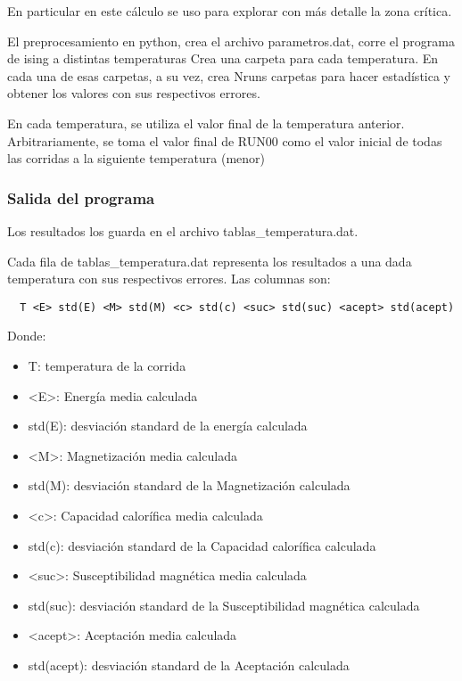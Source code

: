 En particular en este c\'alculo se uso para explorar con m\'as detalle la zona
cr\'itica.

El preprocesamiento en python, crea el archivo parametros.dat, 
 corre el programa de ising a distintas temperaturas
  Crea una carpeta para cada temperatura. En cada una de esas carpetas, a su
  vez, crea Nruns carpetas para hacer estadística y obtener los valores con
  sus respectivos errores.
 
  En cada temperatura, se utiliza el valor final de la temperatura anterior.
  Arbitrariamente, se toma el valor final de RUN00 como el valor inicial de
  todas las corridas a la siguiente temperatura (menor)
 

\subsubsection{Salida del programa}

Los resultados los guarda en el archivo tablas\_temperatura.dat.

Cada fila de tablas\_temperatura.dat representa los resultados a una dada
temperatura con sus respectivos errores. Las columnas son:

\begin{verbatim}
  T <E> std(E) <M> std(M) <c> std(c) <suc> std(suc) <acept> std(acept)
\end{verbatim}

Donde:



\begin{itemize}
  \item T: temperatura de la corrida 
    \item <E>: Energ\'ia media calculada
    \item  std(E): desviaci\'on standard de la energ\'ia calculada

    \item <M>: Magnetizaci\'on media calculada
    \item  std(M): desviaci\'on standard de la Magnetizaci\'on calculada


    \item <c>: Capacidad calor\'ifica media calculada
    \item  std(c): desviaci\'on standard de la Capacidad calor\'ifica calculada

    \item <suc>: Susceptibilidad magn\'etica media calculada
    \item  std(suc): desviaci\'on standard de la Susceptibilidad magn\'etica calculada


    \item <acept>: Aceptaci\'on media calculada
    \item  std(acept): desviaci\'on standard de la Aceptaci\'on calculada
\end{itemize}



